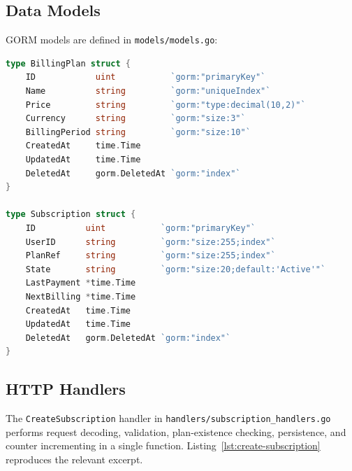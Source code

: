 \subsection{Data Models}

GORM models are defined in \texttt{models/models.go}:

\begin{lstlisting}[language=Go]
type BillingPlan struct {
    ID            uint           `gorm:"primaryKey"`
    Name          string         `gorm:"uniqueIndex"`
    Price         string         `gorm:"type:decimal(10,2)"`
    Currency      string         `gorm:"size:3"`
    BillingPeriod string         `gorm:"size:10"`
    CreatedAt     time.Time
    UpdatedAt     time.Time
    DeletedAt     gorm.DeletedAt `gorm:"index"`
}

type Subscription struct {
    ID          uint           `gorm:"primaryKey"`
    UserID      string         `gorm:"size:255;index"`
    PlanRef     string         `gorm:"size:255;index"`
    State       string         `gorm:"size:20;default:'Active'"`
    LastPayment *time.Time
    NextBilling *time.Time
    CreatedAt   time.Time
    UpdatedAt   time.Time
    DeletedAt   gorm.DeletedAt `gorm:"index"`
}
\end{lstlisting}

\subsection{HTTP Handlers}

The \texttt{CreateSubscription} handler in \texttt{handlers/subscription\_handlers.go} performs request decoding, validation, plan-existence checking, persistence, and counter incrementing in a single function. Listing~\ref{lst:create-subscription} reproduces the relevant excerpt.

